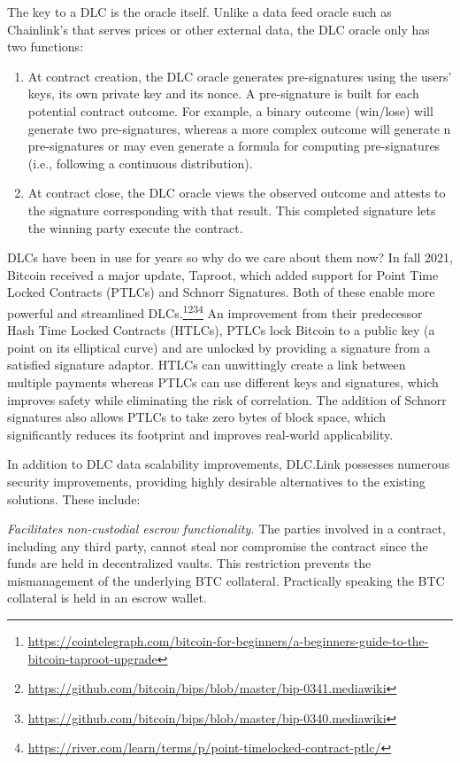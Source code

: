 \documentclass[twoside, a4paper, 11pt]{article}
\begin{document}
  The key to a DLC is the oracle itself. Unlike a data feed oracle such as Chainlink’s that serves prices or other external data, the DLC oracle only has two functions:

  \begin{enumerate}
    \item At contract creation, the DLC oracle generates pre-signatures using the users’ keys, its own private key and its nonce. A pre-signature is built for each potential contract outcome. For example, a binary outcome (win/lose) will generate two pre-signatures, whereas a more complex outcome will generate n pre-signatures or may even generate a formula for computing pre-signatures (i.e., following a continuous distribution).
    \item At contract close, the DLC oracle views the observed outcome and attests to the signature corresponding with that result. This completed signature lets the winning party execute the contract.
  \end{enumerate}

  DLCs have been in use for years so why do we care about them now? In fall 2021, Bitcoin received a major update, Taproot, which added support for Point Time Locked Contracts (PTLCs) and Schnorr Signatures. Both of these enable more powerful and streamlined DLCs.\footnote{\url{https://cointelegraph.com/bitcoin-for-beginners/a-beginners-guide-to-the-bitcoin-taproot-upgrade}}\footnote{\url{https://github.com/bitcoin/bips/blob/master/bip-0341.mediawiki}}\footnote{\url{https://github.com/bitcoin/bips/blob/master/bip-0340.mediawiki}}\footnote{\url{https://river.com/learn/terms/p/point-timelocked-contract-ptlc/}} An improvement from their predecessor Hash Time Locked Contracts (HTLCs), PTLCs lock Bitcoin to a public key (a point on its elliptical curve) and are unlocked by providing a signature from a satisfied signature adaptor. HTLCs can unwittingly create a link between multiple payments whereas PTLCs can use different keys and signatures, which improves safety while eliminating the risk of correlation. The addition of Schnorr signatures also allows PTLCs to take zero bytes of block space, which significantly reduces its footprint and improves real-world applicability.

  In addition to DLC data scalability improvements, DLC.Link possesses numerous security improvements, providing highly desirable alternatives to the existing solutions. These include:

  \emph{Facilitates non-custodial escrow functionality.} The parties involved in a contract, including any third party, cannot steal nor compromise the contract since the funds are held in decentralized vaults. This restriction prevents the mismanagement of the underlying BTC collateral. Practically speaking the BTC collateral is held in an escrow wallet.
\end{document}
